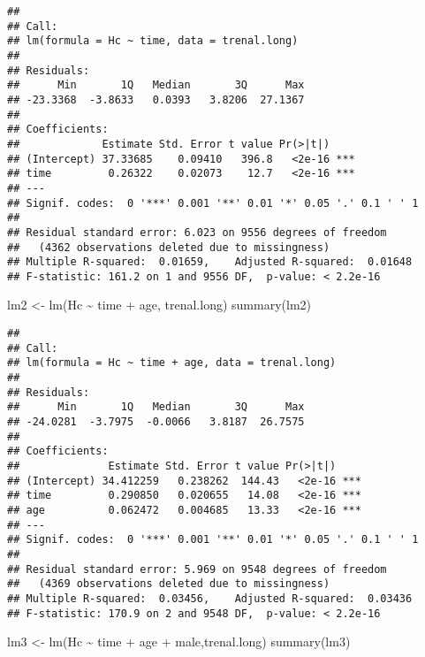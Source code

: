 \documentclass[
]{article}
\newenvironment{Shaded}{\begin{snugshade}}{\end{snugshade}}
\newcommand{\FunctionTok}[1]{\textcolor[rgb]{0.00,0.00,0.00}{#1}}
\newcommand{\NormalTok}[1]{#1}
\newcommand{\OtherTok}[1]{\textcolor[rgb]{0.56,0.35,0.01}{#1}}
\newcommand{\SpecialCharTok}[1]{\textcolor[rgb]{0.00,0.00,0.00}{#1}}
\begin{document}
\begin{verbatim}
## 
## Call:
## lm(formula = Hc ~ time, data = trenal.long)
## 
## Residuals:
##      Min       1Q   Median       3Q      Max 
## -23.3368  -3.8633   0.0393   3.8206  27.1367 
## 
## Coefficients:
##             Estimate Std. Error t value Pr(>|t|)    
## (Intercept) 37.33685    0.09410   396.8   <2e-16 ***
## time         0.26322    0.02073    12.7   <2e-16 ***
## ---
## Signif. codes:  0 '***' 0.001 '**' 0.01 '*' 0.05 '.' 0.1 ' ' 1
## 
## Residual standard error: 6.023 on 9556 degrees of freedom
##   (4362 observations deleted due to missingness)
## Multiple R-squared:  0.01659,    Adjusted R-squared:  0.01648 
## F-statistic: 161.2 on 1 and 9556 DF,  p-value: < 2.2e-16
\end{verbatim}

\begin{Shaded}
\begin{Highlighting}[]
\NormalTok{lm2 }\OtherTok{\textless{}{-}} \FunctionTok{lm}\NormalTok{(Hc }\SpecialCharTok{\textasciitilde{}}\NormalTok{ time }\SpecialCharTok{+}\NormalTok{ age, trenal.long)}
\FunctionTok{summary}\NormalTok{(lm2)}
\end{Highlighting}
\end{Shaded}

\begin{verbatim}
## 
## Call:
## lm(formula = Hc ~ time + age, data = trenal.long)
## 
## Residuals:
##      Min       1Q   Median       3Q      Max 
## -24.0281  -3.7975  -0.0066   3.8187  26.7575 
## 
## Coefficients:
##              Estimate Std. Error t value Pr(>|t|)    
## (Intercept) 34.412259   0.238262  144.43   <2e-16 ***
## time         0.290850   0.020655   14.08   <2e-16 ***
## age          0.062472   0.004685   13.33   <2e-16 ***
## ---
## Signif. codes:  0 '***' 0.001 '**' 0.01 '*' 0.05 '.' 0.1 ' ' 1
## 
## Residual standard error: 5.969 on 9548 degrees of freedom
##   (4369 observations deleted due to missingness)
## Multiple R-squared:  0.03456,    Adjusted R-squared:  0.03436 
## F-statistic: 170.9 on 2 and 9548 DF,  p-value: < 2.2e-16
\end{verbatim}

\begin{Shaded}
\begin{Highlighting}[]
\NormalTok{lm3 }\OtherTok{\textless{}{-}} \FunctionTok{lm}\NormalTok{(Hc }\SpecialCharTok{\textasciitilde{}}\NormalTok{ time }\SpecialCharTok{+}\NormalTok{ age }\SpecialCharTok{+}\NormalTok{ male,trenal.long)}
\FunctionTok{summary}\NormalTok{(lm3)}
\end{Highlighting}
\end{Shaded}
\end{document}
